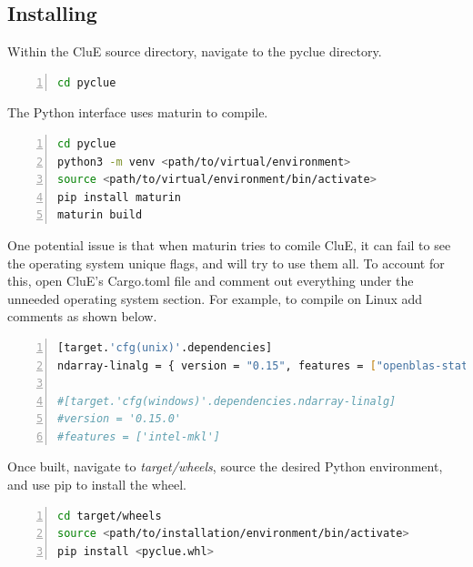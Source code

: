 \documentclass{book}
\begin{document}
\subsection{Installing}
Within the CluE source directory, navigate to the pyclue directory.
\begin{lstlisting}[frame=single,numbers=left,language=bash]
cd pyclue
\end{lstlisting}
The Python interface uses maturin\cite{maturin} to compile.
\begin{lstlisting}[frame=single,numbers=left,language=bash]
cd pyclue
python3 -m venv <path/to/virtual/environment>
source <path/to/virtual/environment/bin/activate>
pip install maturin
maturin build
\end{lstlisting}
One potential issue is that when maturin tries to comile CluE, 
it can fail to see the operating system unique flags, and will try to use them
all.  To account for this, open CluE's Cargo.toml file and comment out 
everything under the unneeded operating system section.  
For example, to compile on Linux add comments as shown below.
\begin{lstlisting}[frame=single,numbers=left,language=bash]
[target.'cfg(unix)'.dependencies]
ndarray-linalg = { version = "0.15", features = ["openblas-static"] }

#[target.'cfg(windows)'.dependencies.ndarray-linalg]
#version = '0.15.0'
#features = ['intel-mkl']
\end{lstlisting}
Once built, navigate to \textit{target/wheels}, source the desired
Python environment, and use pip to install the wheel.
\begin{lstlisting}[frame=single,numbers=left,language=bash]
cd target/wheels
source <path/to/installation/environment/bin/activate>
pip install <pyclue.whl>
\end{lstlisting}
\end{document}
